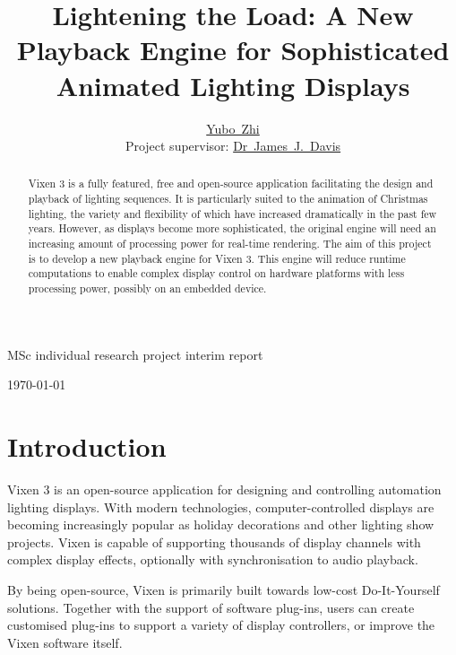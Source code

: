 \documentclass[journal]{IEEEtran}
\begin{document}
\title{Lightening the Load: A New Playback Engine for Sophisticated Animated Lighting Displays}

\author{\href{yz4116@imperial.ac.uk}{Yubo~Zhi}\\
	Project supervisor: \href{james.davis06@imperial.ac.uk}{Dr~James~J.~Davis}}

%
{MSc individual research project interim report}

\maketitle

\begin{abstract}
Vixen 3 is a fully featured, free and open-source application facilitating the design and playback of lighting sequences. It is particularly suited to the animation of Christmas lighting, the variety and flexibility of which have increased dramatically in the past few years. However, as displays become more sophisticated, the original engine will need an increasing amount of processing power for real-time rendering. The aim of this project is to develop a new playback engine for Vixen 3. This engine will reduce runtime computations to enable complex display control on hardware platforms with less processing power, possibly on an embedded device.
\end{abstract}

\hfill \today


\tableofcontents

\section{Introduction}

Vixen 3 \cite{vixen} is an open-source application for designing and controlling automation lighting displays. With modern technologies, computer-controlled displays are becoming increasingly popular as holiday decorations and other lighting show projects. Vixen is capable of supporting thousands of display channels with complex display effects, optionally with synchronisation to audio playback.

By being open-source, Vixen is primarily built towards low-cost Do-It-Yourself solutions. Together with the support of software plug-ins, users can create customised plug-ins to support a variety of display controllers, or improve the Vixen software itself.
\end{document}
